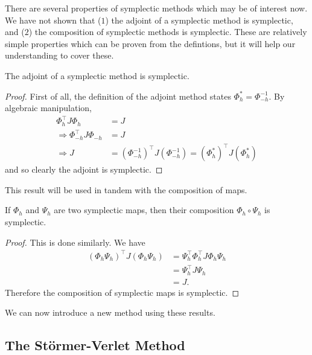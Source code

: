 There are several properties of symplectic methods which may be of interest now.
We have not shown that ($1$) the adjoint of a symplectic method is symplectic, and ($2$) the composition of symplectic methods is symplectic.
These are relatively simple properties which can be proven from the defintions, but it will help our understanding to cover these.
\begin{proposition}
	The adjoint of a symplectic method is symplectic.
\end{proposition}
\begin{proof}
	First of all, the definition of the adjoint method states $\Phi^*_h = \Phi^{-1}_{-h}$.
	By algebraic manipulation,
	\begin{align*}
		\Phi_h^\intercal J \Phi_h &= J \\
		\Rightarrow \Phi_{-h}^\intercal J \Phi_{-h} &= J \\
		\Rightarrow J &= (\Phi_{-h}^{-1})^\intercal J (\Phi_{-h}^{-1}) = (\Phi_h^*)^\intercal J (\Phi_h^*)
	\end{align*}
	and so clearly the adjoint is symplectic.
\end{proof}
This result will be used in tandem with the composition of maps.
\begin{proposition}
	If $\Phi_h$ and $\Psi_h$ are two symplectic maps, then their composition $\Phi_h \circ \Psi_h$ is symplectic.
\end{proposition}
\begin{proof}
	This is done similarly. We have
	\begin{align*}
		\left(\Phi_h \Psi_h\right)^\intercal J \left(\Phi_h \Psi_h\right) &= \Psi_h^\intercal \Phi_h^\intercal J \Phi_h \Psi_h \\
		&= \Psi_h^\intercal J \Psi_h \\
		&= J.
	\end{align*}
	Therefore the composition of symplectic maps is symplectic.	
\end{proof}

We can now introduce a new method using these results.

\subsection{The St\"ormer-Verlet Method}

